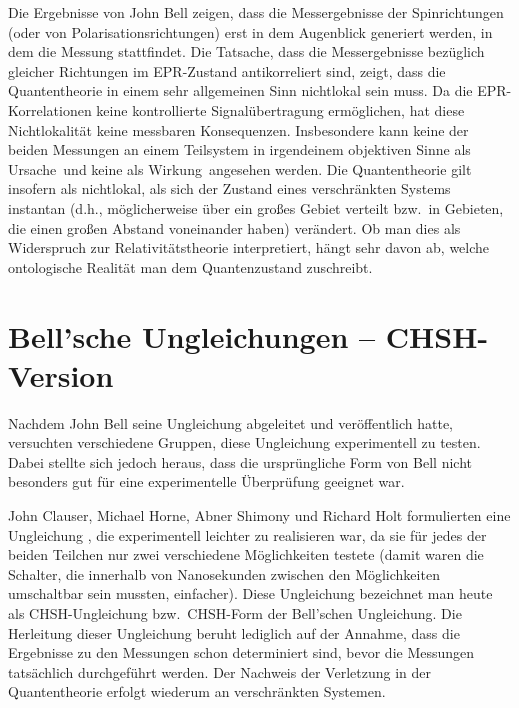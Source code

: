 Die Ergebnisse von John Bell zeigen, dass die Messergebnisse
der Spinrichtungen (oder von Polarisationsrichtungen) erst
in dem Augenblick generiert werden, in dem die Messung
stattfindet. Die Tatsache, dass die Messergebnisse bez\"uglich
gleicher Richtungen im EPR-Zustand antikorreliert sind,
zeigt, dass die Quantentheorie in einem sehr allgemeinen
Sinn nichtlokal sein muss.
Da die EPR-Korrelationen keine kontrollierte 
Signal\-\"uber\-tragung erm\"oglichen, hat diese
Nichtlokalit\"at keine messbaren Konsequenzen. Insbesondere
kann keine der beiden Messungen an einem Teilsystem in irgendeinem objektiven Sinne als
\glqq Ursache\grqq\ und keine als \glqq Wirkung\grqq\ angesehen werden. 
Die Quantentheorie gilt insofern als nichtlokal,
als sich der Zustand eines
verschr\"ankten Systems instantan (d.h., m\"oglicherweise
\"uber ein gro\ss es Gebiet verteilt bzw.\ in Gebieten, die
einen gro\ss en Abstand voneinander haben) ver\"andert.
Ob man dies als Widerspruch zur Relativit\"atstheorie 
interpretiert, h\"angt sehr davon ab, welche
ontologische Realit\"at man dem Quantenzustand zuschreibt.

\section{Bell'sche Ungleichungen -- CHSH-Version}
\label{sec_CHSH}

Nachdem John Bell seine Ungleichung abgeleitet und
ver\"offentlich hatte, versuchten verschiedene Gruppen,
diese Ungleichung experimentell zu testen. Dabei stellte
sich jedoch heraus, dass die urspr\"ungliche Form von
Bell nicht besonders gut f\"ur eine experimentelle
\"Uberpr\"ufung geeignet war. 

John Clauser, Michael Horne, 
Abner Shimony und
Richard Holt formulierten eine
Ungleichung \cite{CHSH}, die experimentell leichter zu
realisieren war, da sie f\"ur jedes der beiden Teilchen
nur zwei verschiedene M\"oglichkeiten testete
(damit waren die Schalter, die innerhalb von Nanosekunden zwischen 
den M\"oglichkeiten
umschaltbar sein mussten, einfacher). 
Diese Ungleichung bezeichnet
man heute als 
CHSH-Ungleichung bzw.\ 
CHSH-Form der Bell'schen Ungleichung.
Die Herleitung dieser Ungleichung beruht lediglich auf der
Annahme, dass die Ergebnisse zu den Messungen schon
determiniert sind, bevor die Messungen tats\"achlich durchgef\"uhrt
werden. Der Nachweis der Verletzung in der Quantentheorie
erfolgt wiederum an verschr\"ankten Systemen.

